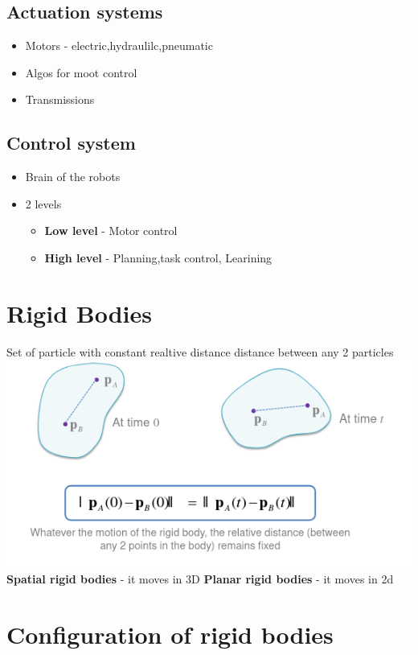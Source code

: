 \documentclass{article}
\begin{document}
\subsection{Actuation systems}
\begin{itemize}
	\item Motors - electric,hydraulilc,pneumatic
	\item Algos for moot control
	\item Transmissions
\end{itemize}
\subsection{Control system}
\begin{itemize}
	\item Brain of the robots
	\item 2 levels
	      \begin{itemize}
		      \item \textbf{Low level} - Motor control
		      \item \textbf{High level} - Planning,task control, Learining
	      \end{itemize}
\end{itemize}
\section{Rigid Bodies}
Set of particle with constant realtive distance distance between any 2 particles
\includegraphics{img/rigidBodies.png}
\textbf{Spatial rigid bodies} - it moves in 3D
\textbf{Planar rigid bodies} - it moves in 2d
\section{Configuration of rigid bodies}
\end{document}
